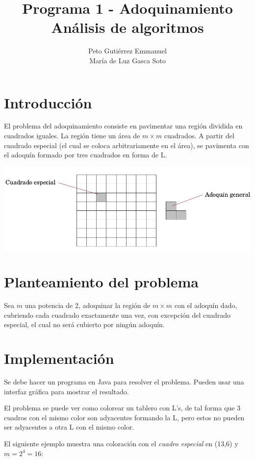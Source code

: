 \documentclass{article}
\title{Programa 1 - Adoquinamiento\\ Análisis de algoritmos}
\author{Peto Gutiérrez Emmanuel \\ María de Luz Gasca Soto}
\begin{document}
\maketitle

\section{Introducción}

El problema del adoquinamiento consiste en pavimentar una región dividida en cuadrados iguales.
La región tiene un área de $m \times m$ cuadrados. A partir del cuadrado especial (el cual se coloca
arbitrariamente en el área), se pavimenta con el adoquín formado por tres cuadrados en forma de {\sf L}.

\includegraphics[scale=0.4]{ejemplo1}

\section{Planteamiento del problema}
Sea $m$ una potencia de 2, adoquinar la región de $m \times m$ con el adoquín dado, cubriendo cada cuadrado
exactamente una vez, con excepción del cuadrado especial, el cual no será cubierto por ningún
adoquín.

\section{Implementación}
Se debe hacer un programa en Java para resolver el problema. Pueden usar una interfaz gráfica para mostrar el resultado.

El problema se puede ver como colorear un tablero con {\sf L}'s, de tal forma que 3 cuadros con el mismo color  son adyacentes formando la {\sf L}, pero estos no pueden ser adyacentes a otra {\sf L} con el mismo color.

El siguiente ejemplo muestra una coloración con el \textit{cuadro especial} en (13,6) y $m = 2^4 = 16$:
\end{document}
